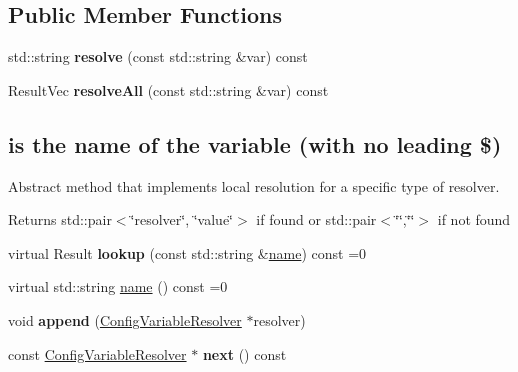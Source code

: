 \subsection*{Public Member Functions}
\begin{DoxyCompactItemize}
\item 
\mbox{\label{classtheoria_1_1config_1_1ConfigVariableResolver_acb155f953e0d353cbd4966ae0d6e50da}} 
std\+::string {\bfseries resolve} (const std\+::string \&var) const
\item 
\mbox{\label{classtheoria_1_1config_1_1ConfigVariableResolver_a406e1024b865b1749c920c83b774b745}} 
Result\+Vec {\bfseries resolve\+All} (const std\+::string \&var) const
\end{DoxyCompactItemize}
\subsection*{is the name of the variable (with no leading \textquotesingle{}\$\textquotesingle{})}
\label{_amgrpa55251cdd20cd6c833ba352b7e8d9b84}%
Abstract method that implements local resolution for a specific type of resolver.

\begin{DoxyReturn}{Returns}
std\+::pair$<$\char`\"{}\textquotesingle{}resolver\textquotesingle{}\char`\"{}, \char`\"{}\textquotesingle{}value\textquotesingle{}\char`\"{}$>$ if found or std\+::pair$<$\char`\"{}\char`\"{},\char`\"{}\char`\"{}$>$ if not found 
\end{DoxyReturn}
\begin{DoxyCompactItemize}
\item 
\mbox{\label{classtheoria_1_1config_1_1ConfigVariableResolver_a85e75133c0fdd67dd8b1d8e678f46ca8}} 
virtual Result {\bfseries lookup} (const std\+::string \&\hyperlink{classtheoria_1_1config_1_1ConfigVariableResolver_a026bda729faf988eaef334a45ec92303}{name}) const =0
\item 
virtual std\+::string \hyperlink{classtheoria_1_1config_1_1ConfigVariableResolver_a026bda729faf988eaef334a45ec92303}{name} () const =0
\item 
\mbox{\label{classtheoria_1_1config_1_1ConfigVariableResolver_aedd40aea06645632c2b380c0181c563b}} 
void {\bfseries append} (\hyperlink{classtheoria_1_1config_1_1ConfigVariableResolver}{Config\+Variable\+Resolver} $\ast$resolver)
\item 
\mbox{\label{classtheoria_1_1config_1_1ConfigVariableResolver_a2861f6405c8b8e6c8c267dd490c46d2a}} 
const \hyperlink{classtheoria_1_1config_1_1ConfigVariableResolver}{Config\+Variable\+Resolver} $\ast$ {\bfseries next} () const
\end{DoxyCompactItemize}


